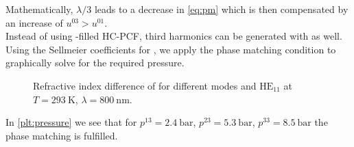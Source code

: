 \documentclass[fleqn, 10pt, twocolumn]{SelfArx}
\begin{document}
    Mathematically, $\lambda/3$ leads to a decrease in \eqref{eq:pm} which is then compensated by an increase of $u^{03}>u^{01}$.\\
    Instead of using -filled HC-PCF, third harmonics can be generated with  as well. 
    Using the Sellmeier coefficients for , we apply the phase matching condition to 
    graphically solve for the required pressure.
    \begin{figure}[h]
        \centering
        \caption{Refractive index difference of  for different  modes and $\text{HE}_{11}$ at $T=\SI{293}{\kelvin}$,  $\lambda=\SI{800}{\nano\meter}$.}
        \label{plt:pressure}
    \end{figure}
    In \autoref{plt:pressure} we see that for $p^{13}=\SI{2.4}{\bar}$, $p^{23}=\SI{5.3}{\bar}$, $p^{33}=\SI{8.5}{\bar}$ the phase matching is fulfilled. 
\end{document}
